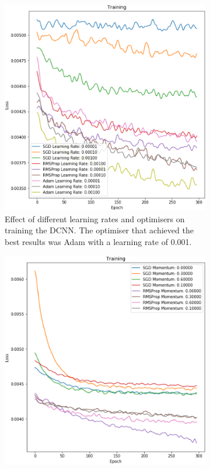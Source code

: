 \documentclass{l4proj}
\begin{document}
\begin{figure}[H]
    \centering
    \begin{subfigure}[t]{0.48\textwidth}
        \includegraphics[width=\textwidth]{images/OptimiserComparison.png}
        \caption{Effect of different learning rates and optimisers on training the DCNN. The optimiser that achieved the best results was Adam with a learning rate of 0.001.}
        \label{fig:learning_rates}
    \end{subfigure}
    \quad
    \begin{subfigure}[t]{0.48\textwidth}
        \includegraphics[width=\textwidth]{images/MomentumComparison.png}

\end{subfigure}
\end{figure}
\end{document}
